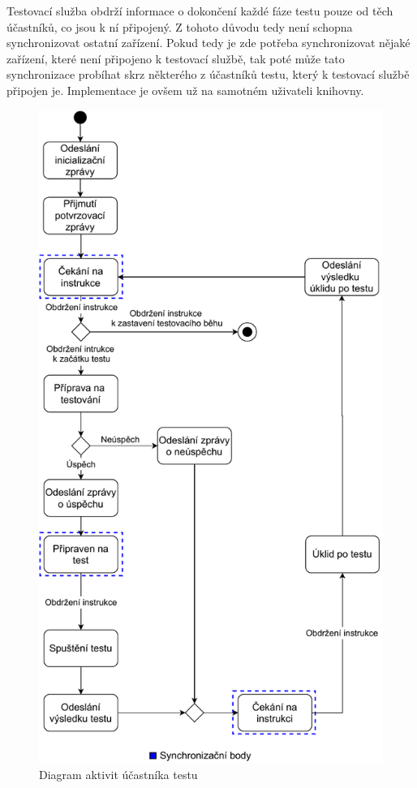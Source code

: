 Testovací služba obdrží informace o dokončení každé fáze testu pouze od těch účastníků, co jsou k ní připojený. Z tohoto důvodu tedy není schopna synchronizovat ostatní zařízení. Pokud tedy je zde potřeba synchronizovat nějaké zařízení, které není připojeno k testovací službě, tak poté může tato synchronizace probíhat skrz některého z účastníků testu, který k testovací službě připojen je. Implementace je ovšem už na samotném uživateli knihovny.

\begin{figure}
    \centering 
    \includegraphics[height=0.98\textheight]{assets/img/bp_assets/activitydiagramdevice.pdf}
    \caption{Diagram aktivit účastníka testu}
    \label{fig:act_diag_device}
\end{figure}



